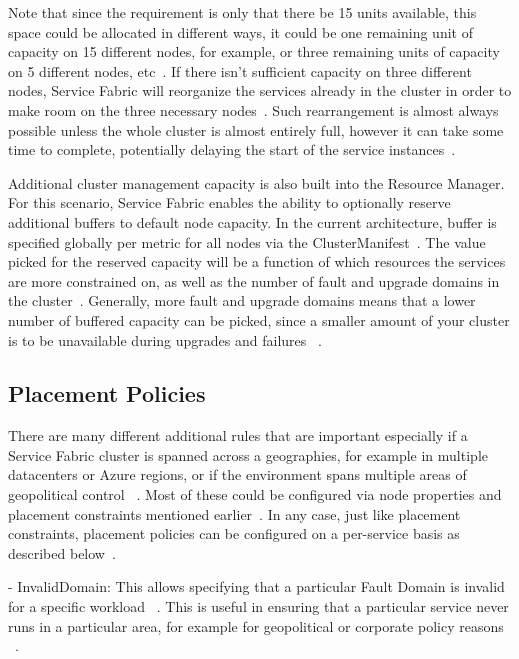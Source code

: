 Note that since the requirement is only that there be 15 units
available, this space could be allocated in different ways, it could
be one remaining unit of capacity on 15 different nodes, for example,
or three remaining units of capacity on 5 different nodes, 
etc~\cite{hid-sp18-501-description}. 
If there isn't sufficient capacity on three different nodes, Service
Fabric will reorganize the services already in the cluster in order to
make room on the three necessary nodes~\cite{hid-sp18-501-description}. 
Such rearrangement is almost
always possible unless the whole cluster is almost entirely full,
however it can take some time to complete, potentially delaying the
start of the service instances~\cite{hid-sp18-501-description}.

Additional cluster management capacity is also built into
the Resource Manager. For this scenario, Service Fabric enables 
the ability to 
optionally reserve 
additional buffers to default node capacity. In the current architecture, 
buffer
is specified globally per metric for all nodes via the
ClusterManifest~\cite{hid-sp18-501-description}. 
The value picked for the reserved capacity will be a
function of which resources the services are more constrained on, as
well as the number of fault and upgrade domains in the
cluster~\cite{hid-sp18-501-description}. Generally, more fault and 
upgrade domains means that a lower
number of buffered capacity can be picked, since a smaller amount of
your cluster is to be unavailable during upgrades and failures
~\cite{hid-sp18-501-description}.

\subsection{Placement Policies}
There are many different additional rules that are important
especially if a Service Fabric cluster is spanned across a geographies, 
for example in multiple datacenters or Azure regions, or if the
environment spans multiple areas of geopolitical control
~\cite{hid-sp18-501-placement}. Most of these
could be configured via node properties and placement constraints
mentioned earlier~\cite{hid-sp18-501-placement}. In any case,
just like placement constraints, placement policies can be configured
on a per-service basis as described below~\cite{hid-sp18-501-placement}.


- InvalidDomain: This allows specifying that a particular
  Fault Domain is invalid for a specific workload
~\cite{hid-sp18-501-placement}.
  This is useful in ensuring that a particular service
  never runs in a particular area,
  for example for geopolitical or corporate policy reasons
~\cite{hid-sp18-501-placement}.
 
